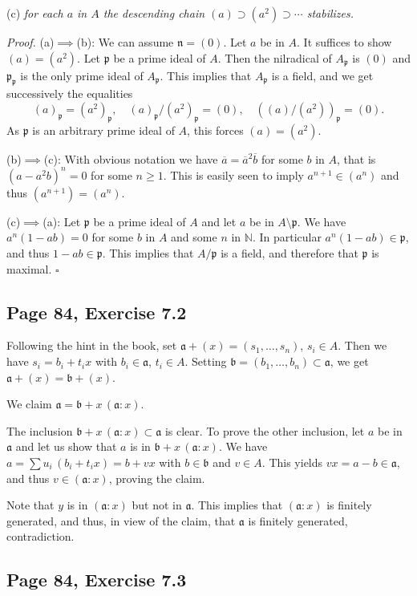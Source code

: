 \documentclass[parskip=half,fontsize=12pt]{scrartcl}%
\newcommand{\mf}{\mathfrak}
\newcommand{\aaa}{\mf a}
\newcommand{\bbb}{\mf b}
\newcommand{\ppp}{\mf p}
\begin{document}
(c) \emph{for each $a$ in $A$ the descending chain $(a)\supset(a^2)\supset\cdots$ stabilizes.}

\emph{Proof.} (a)$\implies$(b): We can assume $\mf n=(0)$. Let $a$ be in $A$. It suffices to show $(a)=(a^2)$. Let $\ppp$ be a prime ideal of $A$. Then the nilradical of $A_\ppp$ is $(0)$ and $\ppp_\ppp$ is the only prime ideal of $A_\ppp$. This implies that $A_\ppp$ is a field, and we get successively the equalities 
$$
(a)_\ppp=(a^2)_\ppp,\quad(a)_\ppp/(a^2)_\ppp=(0),\quad((a)/(a^2))_\ppp=(0).
$$ 
As $\ppp$ is an arbitrary prime ideal of $A$, this forces $(a)=(a^2)$.

(b)$\implies$(c): With obvious notation we have $\overline a=\overline a^2\overline b$ for some $b$ in $A$, that is $(a-a^2b)^n=0$ for some $n\ge1$. This is easily seen to imply $a^{n+1}\in(a^n)$ and thus $(a^{n+1})=(a^n)$. 

(c)$\implies$(a): Let $\ppp$ be a prime ideal of $A$ and let $a$ be in $A\setminus\ppp$. We have $a^n(1-ab)=0$ for some $b$ in $A$ and some $n$ in $\mathbb N$. In particular $a^n(1-ab)\in\ppp$, and thus $1-ab\in\ppp$. This implies that $A/\ppp$ is a field, and therefore that $\ppp$ is maximal. $\square$

\subsection{Page 84, Exercise 7.2}%

Following the hint in the book, set $\aaa+(x)=(s_1,\dots,s_n)$, $s_i\in A$. Then we have $s_i=b_i+t_ix$ with $b_i\in\aaa$, $t_i\in A$. Setting $\bbb=(b_1,\dots,b_n)\subset\aaa$, we get $\aaa+(x)=\bbb+(x)$. 

We claim $\aaa=\bbb+x\,(\aaa:x)$. 

The inclusion $\bbb+x\,(\aaa:x)\subset\aaa$ is clear. To prove the other inclusion, let $a$ be in $\aaa$ and let us show that $a$ is in $\bbb+x\,(\aaa:x)$. We have $a=\sum u_i\,(b_i+t_ix)=b+vx$ with $b\in\bbb$ and $v\in A$. This yields $vx=a-b\in\aaa$, and thus $v\in(\aaa:x)$, proving the claim.

Note that $y$ is in $(\aaa:x)$ but not in $\aaa$. This implies that $(\aaa:x)$ is finitely generated, and thus, in view of the claim, that $\aaa$ is finitely generated, contradiction.

\subsection{Page 84, Exercise 7.3}%
\end{document}
